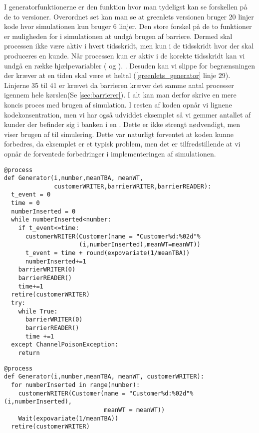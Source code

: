 I generatorfunktionerne er den funktion hvor man tydeligst kan  se forskellen på de to versioner. Overordnet set kan man se at greenlets versionen bruger 20 linjer kode hvor simulationen kun bruger 6 linjer. Den store forskel på de to funktioner er muligheden for i simulationen  at undgå brugen af barriere. Dermed skal processen ikke være aktiv i hvert tidsskridt, men kun i de tidsskridt hvor der skal produceres en kunde. Når processen kun er aktiv i de korekte tidsskridt kan vi undgå en række hjælpevariabler ( og ). . Desuden kan vi slippe for begrænsningen der kræver at en tiden skal være et heltal (\cref{greenlets_generator} linje 29). Linjerne 35 til 41 er krævet da barrieren kræver det samme antal processer igennem hele kørslen(Se \cref{sec:barrierer}). I alt kan man derfor skrive en mere koncis proces med brugen af simulation. I resten af koden opnår vi lignene kodekonsentration, men vi har også udviddet eksemplet så vi gemmer antallet af kunder der befinder sig i banken i en . Dette er ikke strengt nødvendigt, men viser brugen af  til simulering. Dette var naturligt forventet at koden kunne forbedres, da eksemplet er et typisk \des problem, men det er tilfredstillende at vi opnår de forventede forbedringer i implementeringen af simulationen.
\begin{lstlisting}[firstnumber=21, label=greenlets_generator, caption=Generatorprocessen for Greenlets versionen]
@process
def Generator(i,number,meanTBA, meanWT,
              customerWRITER,barrierWRITER,barrierREADER):
  t_event = 0
  time = 0
  numberInserted = 0
  while numberInserted<number:
    if t_event<=time:
      customerWRITER(Customer(name = "Customer%d:%02d"%
                     (i,numberInserted),meanWT=meanWT))
      t_event = time + round(expovariate(1/meanTBA))
      numberInserted+=1
    barrierWRITER(0)
    barrierREADER()
    time+=1
  retire(customerWRITER)
  try:
    while True:
      barrierWRITER(0)
      barrierREADER()
      time +=1
  except ChannelPoisonException: 
    return
\end{lstlisting}
\begin{lstlisting}[firstnumber=20, label=simulation_generator, caption=Generatorprocessen for Simulationsversionen]
@process
def Generator(i,number,meanTBA, meanWT, customerWRITER):
  for numberInserted in range(number):
    customerWRITER(Customer(name = "Customer%d:%02d"%(i,numberInserted),
                            meanWT = meanWT))
    Wait(expovariate(1/meanTBA))
  retire(customerWRITER)
\end{lstlisting}

